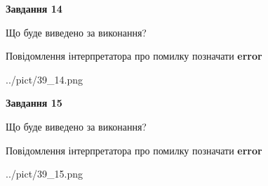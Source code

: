 \documentclass[11pt, ukrainian]{article}
\begin{document}
{\begin {large}
{\begin {center}\textbf{Завдання 14}\end {center}}\par
Що буде виведено за виконання? \par
Повідомлення інтерпретатора про помилку позначати \textbf{error}

\begin{center}
	{../pict/39_14.png}
\end{center}
\newpage

{\begin {center}\textbf{Завдання 15}\end {center}}\par
Що буде виведено за виконання? \par
Повідомлення інтерпретатора про помилку позначати \textbf{error}

\begin{center}
	{../pict/39_15.png}
\end{center}
\newpage

\end {large}}
\end{document}
